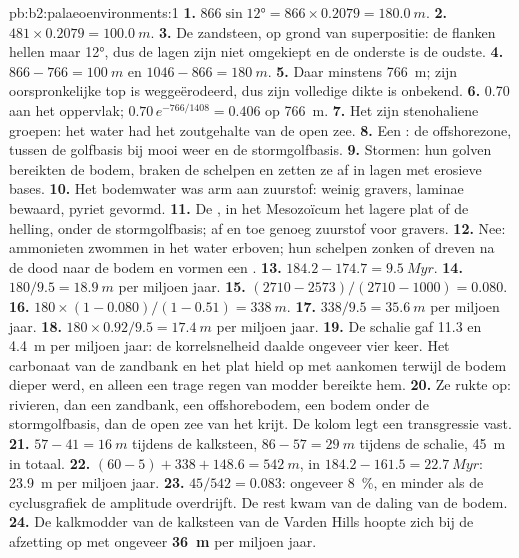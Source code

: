 \begin{solution}{pb:b2:palaeoenvironments:1}
\textbf{1.} $866 \sin \ang{12} = 866 \times 0.2079 = \qty{180.0}{m}$.
\textbf{2.} $481 \times 0.2079 = \qty{100.0}{m}$.
\textbf{3.} De zandsteen, op grond van superpositie: de flanken hellen maar \ang{12}, dus de lagen zijn niet
omgekiept en de onderste is de oudste.
\textbf{4.} $866 - 766 = \qty{100}{m}$ en $1046 - 866 = \qty{180}{m}$.
\textbf{5.} Daar minstens \qty{766}{m}; zijn oorspronkelijke top is weggeërodeerd, dus zijn volledige dikte is
onbekend.
\textbf{6.} 0.70 aan het oppervlak; $0.70\,e^{-766/1408} = 0.406$ op \qty{766}{m}.
\textbf{7.} Het zijn stenohaliene groepen: het water had het zoutgehalte van de open zee.
\textbf{8.} Een : de offshorezone, tussen de golfbasis bij mooi weer en de
stormgolfbasis.
\textbf{9.} Stormen: hun golven bereikten de bodem, braken de schelpen en zetten ze af in lagen
met erosieve bases.
\textbf{10.} Het bodemwater was arm aan zuurstof: weinig gravers, laminae bewaard, pyriet gevormd.
\textbf{11.} De , in het Mesozoïcum het lagere plat of de helling, onder de
stormgolfbasis; af en toe genoeg zuurstof voor gravers.
\textbf{12.} Nee: ammonieten zwommen in het water erboven; hun schelpen zonken of dreven na de dood naar de bodem
en vormen een .
\textbf{13.} $184.2 - 174.7 = \qty{9.5}{Myr}$.
\textbf{14.} $180/9.5 = \qty{18.9}{m}$ per miljoen jaar.
\textbf{15.} $(2710 - 2573)/(2710 - 1000) = 0.080$.
\textbf{16.} $180 \times (1 - 0.080)/(1 - 0.51) = \qty{338}{m}$.
\textbf{17.} $338/9.5 = \qty{35.6}{m}$ per miljoen jaar.
\textbf{18.} $180 \times 0.92/9.5 = \qty{17.4}{m}$ per miljoen jaar.
\textbf{19.} De schalie gaf 11.3 en \qty{4.4}{m} per miljoen jaar: de korrelsnelheid daalde
ongeveer vier keer. Het carbonaat van de zandbank en het plat hield op met aankomen terwijl de bodem
dieper werd, en alleen een trage regen van modder bereikte hem.
\textbf{20.} Ze rukte op: rivieren, dan een zandbank, een offshorebodem, een bodem onder de
stormgolfbasis, dan de open zee van het krijt. De kolom legt een transgressie vast.
\textbf{21.} $57 - 41 = \qty{16}{m}$ tijdens de kalksteen, $86 - 57 = \qty{29}{m}$ tijdens de schalie,
\qty{45}{m} in totaal.
\textbf{22.} $(60 - 5) + 338 + 148.6 = \qty{542}{m}$, in $184.2 - 161.5 = \qty{22.7}{Myr}$:
\qty{23.9}{m} per miljoen jaar.
\textbf{23.} $45/542 = 0.083$: ongeveer \qty{8}{\percent}, en minder als de cyclusgrafiek
de amplitude overdrijft. De rest kwam van de daling van de bodem.
\textbf{24.} De kalkmodder van de kalksteen van de Varden Hills hoopte zich bij de afzetting op met ongeveer
\textbf{\qty[text-series-to-math=true]{36}{m}} per miljoen jaar.
\end{solution}
